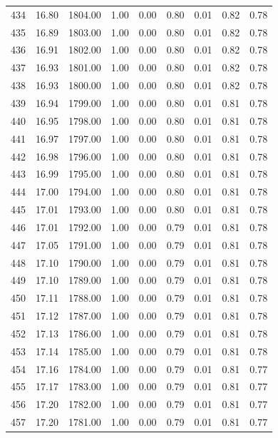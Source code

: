 \documentclass{article}\usepackage[]{graphicx}\usepackage[]{color}
\begin{document}
\begin{longtable}{rrrrrrrrr}
  434 & 16.80 & 1804.00 & 1.00 & 0.00 & 0.80 & 0.01 & 0.82 & 0.78 \\ 
  435 & 16.89 & 1803.00 & 1.00 & 0.00 & 0.80 & 0.01 & 0.82 & 0.78 \\ 
  436 & 16.91 & 1802.00 & 1.00 & 0.00 & 0.80 & 0.01 & 0.82 & 0.78 \\ 
  437 & 16.93 & 1801.00 & 1.00 & 0.00 & 0.80 & 0.01 & 0.82 & 0.78 \\ 
  438 & 16.93 & 1800.00 & 1.00 & 0.00 & 0.80 & 0.01 & 0.82 & 0.78 \\ 
  439 & 16.94 & 1799.00 & 1.00 & 0.00 & 0.80 & 0.01 & 0.81 & 0.78 \\ 
  440 & 16.95 & 1798.00 & 1.00 & 0.00 & 0.80 & 0.01 & 0.81 & 0.78 \\ 
  441 & 16.97 & 1797.00 & 1.00 & 0.00 & 0.80 & 0.01 & 0.81 & 0.78 \\ 
  442 & 16.98 & 1796.00 & 1.00 & 0.00 & 0.80 & 0.01 & 0.81 & 0.78 \\ 
  443 & 16.99 & 1795.00 & 1.00 & 0.00 & 0.80 & 0.01 & 0.81 & 0.78 \\ 
  444 & 17.00 & 1794.00 & 1.00 & 0.00 & 0.80 & 0.01 & 0.81 & 0.78 \\ 
  445 & 17.01 & 1793.00 & 1.00 & 0.00 & 0.80 & 0.01 & 0.81 & 0.78 \\ 
  446 & 17.01 & 1792.00 & 1.00 & 0.00 & 0.79 & 0.01 & 0.81 & 0.78 \\ 
  447 & 17.05 & 1791.00 & 1.00 & 0.00 & 0.79 & 0.01 & 0.81 & 0.78 \\ 
  448 & 17.10 & 1790.00 & 1.00 & 0.00 & 0.79 & 0.01 & 0.81 & 0.78 \\ 
  449 & 17.10 & 1789.00 & 1.00 & 0.00 & 0.79 & 0.01 & 0.81 & 0.78 \\ 
  450 & 17.11 & 1788.00 & 1.00 & 0.00 & 0.79 & 0.01 & 0.81 & 0.78 \\ 
  451 & 17.12 & 1787.00 & 1.00 & 0.00 & 0.79 & 0.01 & 0.81 & 0.78 \\ 
  452 & 17.13 & 1786.00 & 1.00 & 0.00 & 0.79 & 0.01 & 0.81 & 0.78 \\ 
  453 & 17.14 & 1785.00 & 1.00 & 0.00 & 0.79 & 0.01 & 0.81 & 0.78 \\ 
  454 & 17.16 & 1784.00 & 1.00 & 0.00 & 0.79 & 0.01 & 0.81 & 0.77 \\ 
  455 & 17.17 & 1783.00 & 1.00 & 0.00 & 0.79 & 0.01 & 0.81 & 0.77 \\ 
  456 & 17.20 & 1782.00 & 1.00 & 0.00 & 0.79 & 0.01 & 0.81 & 0.77 \\ 
  457 & 17.20 & 1781.00 & 1.00 & 0.00 & 0.79 & 0.01 & 0.81 & 0.77 \\ 

\end{longtable}
\end{document}
